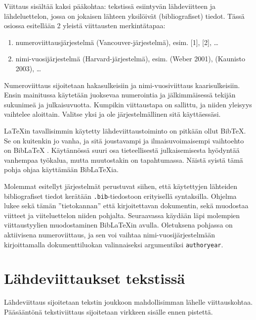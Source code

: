 Viittaus sisältää kaksi pääkohtaa: tekstissä esiintyvän lähdeviitteen ja lähdeluettelon, jossa on jokaisen lähteen yksilöivät (bibliografiset) tiedot. Tässä osiossa esitellään 2 yleistä viittausten merkintätapaa:
\begin{enumerate}
    \item numeroviittausjärjestelmä (Vancouver-järjestelmä), esim. [1], [2], \ldots
    \item nimi-vuosijärjestelmä (Harvard-järjestelmä), esim. (Weber 2001), (Kaunisto 2003), \ldots
\end{enumerate}
Numeroviittaus sijoitetaan hakasulkeisiin ja nimi-vuosiviittaus kaarisulkeisiin. Ensin mainitussa käytetään juoksevaa numerointia ja jälkimmäisessä tekijän sukunimeä ja julkaisuvuotta. Kumpikin viittaustapa on sallittu, ja niiden yleisyys vaihtelee aloittain. Valitse yksi ja ole järjestelmällinen sitä käyttäessäsi.

\LaTeX{}in tavallisimmin käytetty lähdeviittaustoiminto on pitkään ollut Bib\TeX. Se on kuitenkin jo vanha, ja sitä joustavampi ja ilmaisuvoimaisempi vaihtoehto on Bib\LaTeX{} \parencite{biblatex}. Käytännössä suuri osa tieteellisestä julkaisemisesta hyödyntää vanhempaa työkalua, mutta muutostakin on tapahtumassa. Näistä syistä tämä pohja ohjaa käyttämään Bib\LaTeX{}ia.

Molemmat esitellyt järjestelmät perustuvat siihen, että käytettyjen lähteiden bibliografiset tiedot kerätään \texttt{.bib}-tiedostoon erityisellä syntaksilla. Ohjelma lukee sekä tämän ''tietokannan'' että kirjoitettavan dokumentin, sekä muodostaa viitteet ja viiteluettelon niiden pohjalta. Seuraavassa käydään läpi molempien viittaustyylien muodostaminen Bib\LaTeX{}in avulla. Oletuksena pohjassa on aktiivisena numeroviittaus, ja sen voi vaihtaa nimi-vuosi\-järjestelmään kirjoittamalla dokumenttiluokan valinnaiseksi argumentiksi \texttt{authoryear}.

\section{Lähdeviittaukset tekstissä}

Lähdeviittaus sijoitetaan tekstin joukkoon mahdollisimman lähelle viittauskohtaa. Pääsääntönä tekstiviittaus sijoitetaan virkkeen sisälle ennen pistettä.

